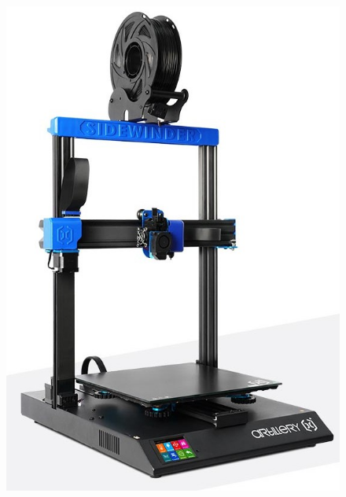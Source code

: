 \begin{figure}[h!tb]
\begin{multicols}{3}
\includegraphics[scale=0.20]{x2-f2-edited.jpg}\par

\end{multicols}
\end{figure}
